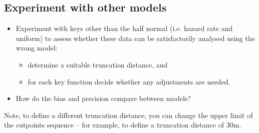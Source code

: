 \documentclass[a4paper, 10pt]{article}
\begin{document}
\subsection{Experiment with other models}
\begin{itemize}
	\item Experiment with keys other than the half normal (i.e. hazard rate and uniform) to assess whether these data can be satisfactorily analysed using the wrong model:
		\begin{itemize}
		  \item determine a suitable truncation distance, and
		  \item for each key function decide whether any adjustments are needed.
		\end{itemize}
	\item How do the bias and precision compare between models?
\end{itemize}

Note, to define a different truncation distance, you can change the upper limit of the cutpoints sequence – for example, to define a truncation distance of 30m.
\end{document}

